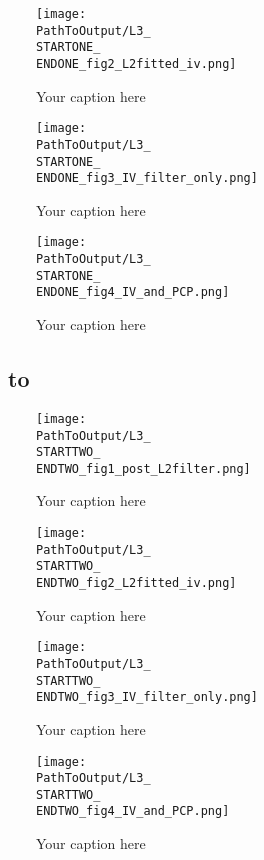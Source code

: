 \begin{appendix}
\begin{figure}[H] %
  \centering
  \texttt{[image: \\PathToOutput/L3\_\\STARTONE\_\\ENDONE\_fig2\_L2fitted\_iv.png]}%
  \caption{Your caption here}
  \label{fig:time1lvl3fig2}
\end{figure}


\begin{figure}[H] %
  \centering
  \texttt{[image: \\PathToOutput/L3\_\\STARTONE\_\\ENDONE\_fig3\_IV\_filter\_only.png]}%
  \caption{Your caption here}
 \label{fig:time1lvl3fig3}
\end{figure}


\begin{figure}[H] %
  \centering
  \texttt{[image: \\PathToOutput/L3\_\\STARTONE\_\\ENDONE\_fig4\_IV\_and\_PCP.png]}%
  \caption{Your caption here}
 \label{fig:time1lvl3fig4}
\end{figure}

\newpage
\subsection{\STARTTWO\ to \ENDTWO }

\begin{figure}[H] %
  \centering
  \texttt{[image: \\PathToOutput/L3\_\\STARTTWO\_\\ENDTWO\_fig1\_post\_L2filter.png]}%
  \caption{Your caption here}
  \label{fig:time2lvl3fig1}
\end{figure}


\begin{figure}[H] %
  \centering
  \texttt{[image: \\PathToOutput/L3\_\\STARTTWO\_\\ENDTWO\_fig2\_L2fitted\_iv.png]}%
  \caption{Your caption here}
  \label{fig:time2lvl3fig2}
\end{figure}


\begin{figure}[H] %
  \centering
  \texttt{[image: \\PathToOutput/L3\_\\STARTTWO\_\\ENDTWO\_fig3\_IV\_filter\_only.png]}%
  \caption{Your caption here}
  \label{fig:time2lvl3fig3}
\end{figure}


\begin{figure}[H] %
  \centering
  \texttt{[image: \\PathToOutput/L3\_\\STARTTWO\_\\ENDTWO\_fig4\_IV\_and\_PCP.png]}%
  \caption{Your caption here}
  \label{fig:time2lvl3fig4}
\end{figure}

\newpage


\end{appendix}


